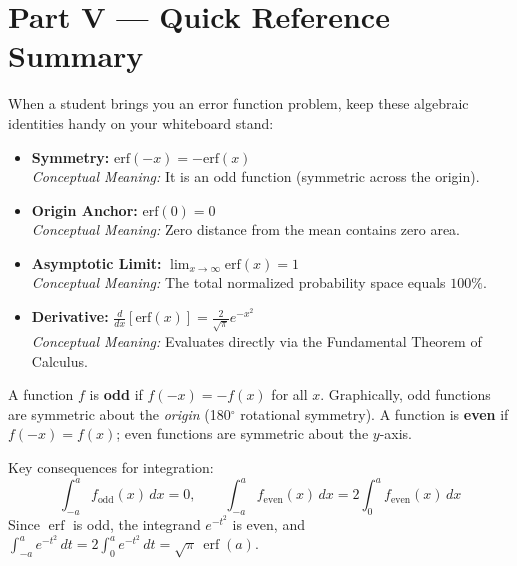 \documentclass[11pt]{article}
\begin{document}
\section*{Part V --- Quick Reference Summary}
\setcounter{section}{5}

When a student brings you an error function problem, keep these algebraic identities handy on your whiteboard stand:

\begin{theorembox}
\begin{itemize}[leftmargin=1.5em]
    \item \textbf{Symmetry:} $\text{erf}(-x) = -\text{erf}(x)$ \\
    \textit{Conceptual Meaning:} It is an odd function (symmetric across the origin).
    \vspace{0.5em}
    \item \textbf{Origin Anchor:} $\text{erf}(0) = 0$ \\
    \textit{Conceptual Meaning:} Zero distance from the mean contains zero area.
    \vspace{0.5em}
    \item \textbf{Asymptotic Limit:} $\lim_{x \to \infty} \text{erf}(x) = 1$ \\
    \textit{Conceptual Meaning:} The total normalized probability space equals $100\%$.
    \vspace{0.5em}
    \item \textbf{Derivative:} $\frac{d}{dx}[\text{erf}(x)] = \frac{2}{\sqrt{\pi}} e^{-x^2}$ \\
    \textit{Conceptual Meaning:} Evaluates directly via the Fundamental Theorem of Calculus.
\end{itemize}
\end{theorembox}

\begin{defnbox}
A function $f$ is \textbf{odd} if $f(-x) = -f(x)$ for all $x$. Graphically, odd functions are symmetric about the \textit{origin} (180$^\circ$ rotational symmetry). A function is \textbf{even} if $f(-x) = f(x)$; even functions are symmetric about the $y$-axis.

Key consequences for integration:
\[ \int_{-a}^{a} f_{\text{odd}}(x)\,dx = 0, \qquad \int_{-a}^{a} f_{\text{even}}(x)\,dx = 2\int_{0}^{a} f_{\text{even}}(x)\,dx \]
Since $\operatorname{erf}$ is odd, the integrand $e^{-t^2}$ is even, and $\int_{-a}^{a} e^{-t^2}\,dt = 2\int_0^a e^{-t^2}\,dt = \sqrt{\pi}\,\operatorname{erf}(a)$.
\end{defnbox}
\end{document}
